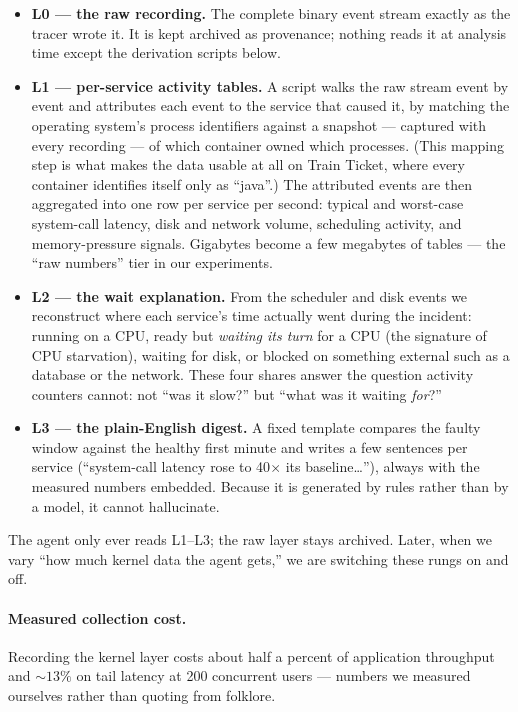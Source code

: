 \begin{itemize}
  \item \textbf{L0 --- the raw recording.} The complete binary event stream exactly
  as the tracer wrote it. It is kept archived as provenance; nothing reads it at
  analysis time except the derivation scripts below.
  \item \textbf{L1 --- per-service activity tables.} A script walks the raw stream
  event by event and attributes each event to the service that caused it, by matching
  the operating system's process identifiers against a snapshot --- captured with
  every recording --- of which container owned which processes. (This mapping step is
  what makes the data usable at all on Train Ticket, where every container identifies
  itself only as ``java''.) The attributed events are then aggregated into one row
  per service per second: typical and worst-case system-call latency, disk and
  network volume, scheduling activity, and memory-pressure signals. Gigabytes become
  a few megabytes of tables --- the ``raw numbers'' tier in our experiments.
  \item \textbf{L2 --- the wait explanation.} From the scheduler and disk events we
  reconstruct where each service's time actually went during the incident: running
  on a CPU, ready but \emph{waiting its turn} for a CPU (the signature of CPU
  starvation), waiting for disk, or blocked on something external such as a database
  or the network. These four shares answer the question activity counters cannot:
  not ``was it slow?'' but ``what was it waiting \emph{for}?''
  \item \textbf{L3 --- the plain-English digest.} A fixed template compares the
  faulty window against the healthy first minute and writes a few sentences per
  service (``system-call latency rose to 40$\times$ its baseline\ldots''), always
  with the measured numbers embedded. Because it is generated by rules rather than
  by a model, it cannot hallucinate.
\end{itemize}

The agent only ever reads L1--L3; the raw layer stays archived. Later, when we vary
``how much kernel data the agent gets,'' we are switching these rungs on and off.

\paragraph{Measured collection cost.} Recording the kernel layer costs about half a
percent of application throughput and ${\sim}13\%$ on tail latency at 200 concurrent
users --- numbers we measured ourselves rather than quoting from folklore.
